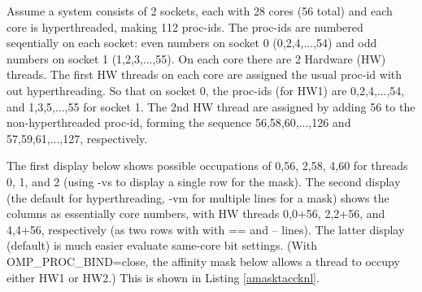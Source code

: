\documentclass[10pt,a4paper]{report}
\begin{document}

Assume a system consists of 2 sockets, each with 28 cores (56 total) and each core is hyperthreaded, making 112 proc-ids. The proc-ids are numbered seqentially on each socket: even numbers on socket 0 (0,2,4,...,54) and odd numbers on socket 1 (1,2,3,...,55).  On each core there are 2 Hardware (HW) threads.  The first HW threads on each core are assigned the usual proc-id with out hyperthreading.  So that on socket 0, the proc-ids (for HW1) are {0,2,4,...,54}, and {1,3,5,...,55} for socket 1.  The 2nd HW thread are assigned by adding 56 to the non-hyperthreaded proc-id, forming the sequence {56,58,60,...,126} and {57,59,61,...,127}, respectively. 

The first display below shows possible occupations of {0,56}, {2,58}, {4,60} for threads 0, 1, and 2 (using -vs to display a single row for the mask).  The second display (the default for hyperthreading, -vm for multiple lines for a mask) shows the columns as essentially core numbers, with HW threads {0,0+56}, {2,2+56}, and {4,4+56}, respectively (as two rows with with == and -- lines).  The latter display (default) is much easier evaluate same-core bit settings.  (With OMP\_PROC\_BIND=close, the affinity mask below allows a thread to occupy either HW1 or HW2.)
This is shown in Listing \ref{amasktaccknl}.

\end{document}
